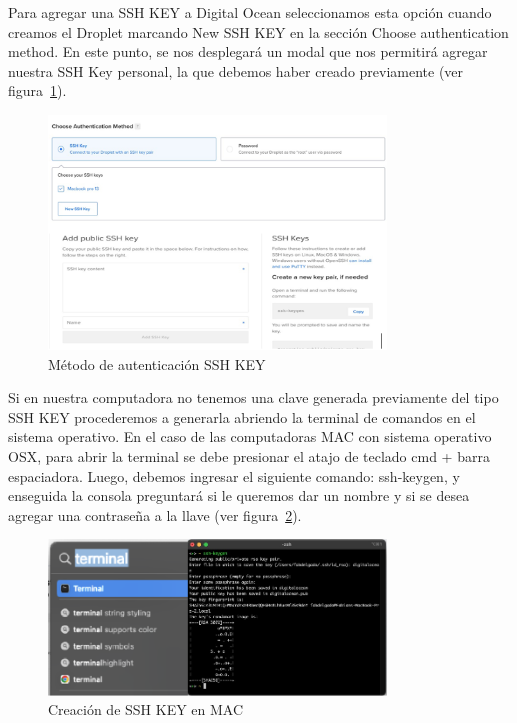 Para agregar una SSH KEY a Digital Ocean seleccionamos esta opción cuando creamos el Droplet marcando New SSH KEY en la sección Choose authentication method. En este punto, se nos desplegará un modal que nos permitirá agregar nuestra SSH Key personal, la que debemos haber creado previamente (ver figura~\ref{Img:Web+Método+de+autenticación+SSH+KEY}).


\begin{figure}[h]
    \centering
    \includegraphics[width=0.8\textwidth]{img/infraestructura/ssh-key.png}
    \caption{Método de autenticación SSH KEY} \label{Img:Web+Método+de+autenticación+SSH+KEY}
\end{figure} 


Si en nuestra computadora no tenemos una clave generada previamente del tipo SSH KEY procederemos a generarla abriendo la terminal de comandos en el sistema operativo. En el caso de las computadoras MAC con sistema operativo OSX, para abrir la terminal se debe presionar el atajo de teclado cmd + barra espaciadora. Luego, debemos ingresar el siguiente comando: ssh-keygen, y enseguida la consola preguntará si le queremos dar un nombre y si se desea agregar una contraseña a la llave (ver figura~\ref{Img:Creación+de+SSH+KEY+en+MAC}).

\begin{figure}[h]
    \centering
    \includegraphics[width=0.8\textwidth]{img/infraestructura/crear-ssh-key-mac.png}
    \caption{Creación de SSH KEY en MAC} \label{Img:Creación+de+SSH+KEY+en+MAC}
\end{figure} 


